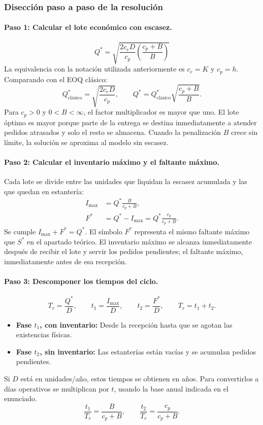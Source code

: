 \documentclass[11pt,a4paper]{article}
\begin{document}
\subsubsection{Disección paso a paso de la resolución}
\paragraph{Paso 1: Calcular el lote económico con escasez.}
\[
    Q^{*}=\sqrt{\frac{2c_eD}{c_p}\left(\frac{c_p+B}{B}\right)}
\]
La equivalencia con la notación utilizada anteriormente es $c_e=K$ y $c_p=h$. Comparando con el EOQ clásico:
\[
    Q_{\text{clásico}}^{*}=\sqrt{\frac{2c_eD}{c_p}},
    \qquad
    Q^{*}=Q_{\text{clásico}}^{*}\sqrt{\frac{c_p+B}{B}}.
\]
Para $c_p>0$ y $0<B<\infty$, el factor multiplicador es mayor que uno. El lote óptimo es mayor porque parte de la entrega se destina inmediatamente a atender pedidos atrasados y solo el resto se almacena. Cuando la penalización $B$ crece sin límite, la solución se aproxima al modelo sin escasez.

\paragraph{Paso 2: Calcular el inventario máximo y el faltante máximo.}
Cada lote se divide entre las unidades que liquidan la escasez acumulada y las que quedan en estantería:
\begin{align*}
    I_{\max} & =Q^{*}\frac{B}{c_p+B}, \\
    F^{*}    & =Q^{*}-I_{\max}
    =Q^{*}\frac{c_p}{c_p+B}.
\end{align*}
Se cumple $I_{\max}+F^{*}=Q^{*}$. El símbolo $F^{*}$ representa el mismo faltante máximo que $S^{*}$ en el apartado teórico. El inventario máximo se alcanza inmediatamente después de recibir el lote y servir los pedidos pendientes; el faltante máximo, inmediatamente antes de esa recepción.

\paragraph{Paso 3: Descomponer los tiempos del ciclo.}
\[
    T_r=\frac{Q^{*}}{D},\qquad
    t_1=\frac{I_{\max}}{D},\qquad
    t_2=\frac{F^{*}}{D},\qquad
    T_r=t_1+t_2.
\]
\begin{itemize}
    \item \textbf{Fase $t_1$, con inventario:} Desde la recepción hasta que se agotan las existencias físicas.
    \item \textbf{Fase $t_2$, sin inventario:} Las estanterías están vacías y se acumulan pedidos pendientes.
\end{itemize}
Si $D$ está en unidades/año, estos tiempos se obtienen en años. Para convertirlos a días operativos se multiplican por $t$, usando la base anual indicada en el enunciado.
\[
    \frac{t_1}{T_r}=\frac{B}{c_p+B},
    \qquad
    \frac{t_2}{T_r}=\frac{c_p}{c_p+B}.
\]
\end{document}
